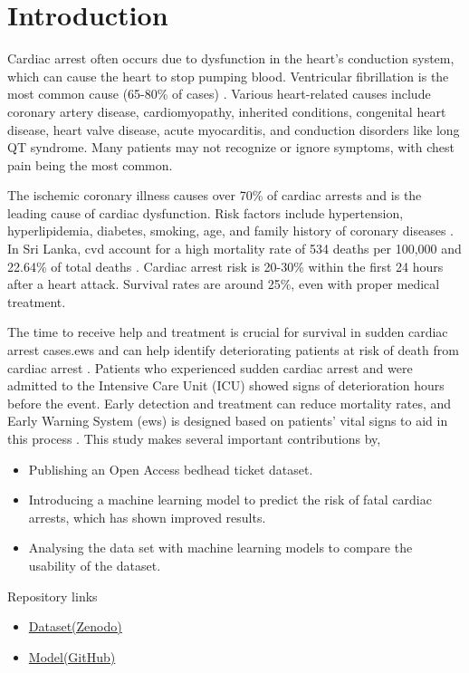 \documentclass[journal,article,submit,pdftex,moreauthors]{Definitions/mdpi}
\begin{document}


\section{Introduction}

Cardiac arrest often occurs due to dysfunction in the heart's conduction system, which can cause the heart to stop pumping blood. Ventricular fibrillation is the most common cause (65-80\% of cases) \cite{b1}. Various heart-related causes include coronary artery disease, cardiomyopathy, inherited conditions, congenital heart disease, heart valve disease, acute myocarditis, and conduction disorders like long QT syndrome. Many patients may not recognize or ignore symptoms, with chest pain being the most common.

The ischemic coronary illness causes over 70\% of cardiac arrests and is the leading cause of cardiac dysfunction. Risk factors include hypertension, hyperlipidemia, diabetes, smoking, age, and family history of coronary diseases \cite{b2}. In Sri Lanka, \gls{cvd} account for a high mortality rate of 534 deaths per 100,000 \cite{b3} and 22.64\% of total deaths \cite{b4}. Cardiac arrest risk is 20-30\% within the first 24 hours after a heart attack. Survival rates are around 25\%, even with proper medical treatment.

The time to receive help and treatment is crucial for survival in sudden cardiac arrest cases.\Gls{ews} and can help identify deteriorating patients at risk of death from cardiac arrest \cite{b5}. Patients who experienced sudden cardiac arrest and were admitted to the Intensive Care Unit (ICU) showed signs of deterioration hours before the event. Early detection and treatment can reduce mortality rates, and Early Warning System (\gls{ews}) is designed based on patients' vital signs to aid in this process \cite{b6}.
This study makes several important contributions by,
\begin{itemize}
    \item Publishing an Open Access bedhead ticket dataset.
    \item Introducing a machine learning model to predict the risk of fatal cardiac arrests, which has shown improved results.
    \item Analysing the data set with machine learning models to compare the usability of the dataset.
\end{itemize}
Repository links
\begin{itemize}
    \item \href{https://zenodo.org/record/7603772}{Dataset(Zenodo)}
    \item \href{https://github.com/LahiruRajapaksha/cardiac-arrest-prediction-using-bed-head-tickets.git}{Model(GitHub)} 
\end{itemize}
\end{document}
